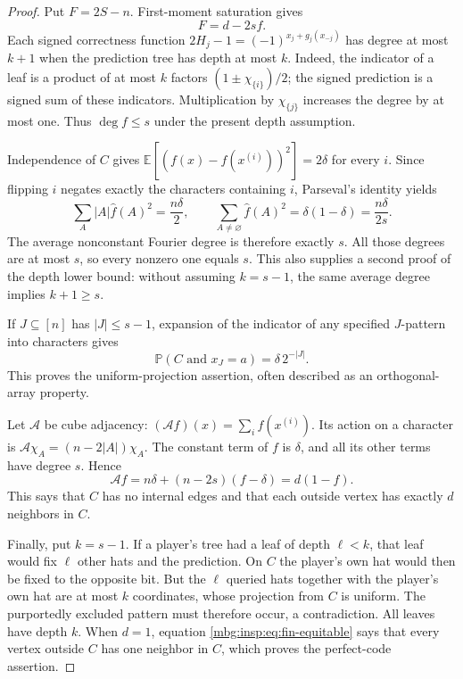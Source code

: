 \documentclass[11pt,letterpaper]{article}
\theoremstyle{definition}
\newcommand{\E}{\mathbb E}
\newcommand{\Prb}{\mathbb P}
\begin{document}
\begin{proof}
Put $F=2S-n$.  First-moment saturation gives
\begin{equation}
 F=d-2sf.
 \label{mbg:insp:eq:fin-F-f}
\end{equation}
Each signed correctness function
$2H_j-1=(-1)^{x_j+g_j(x_{-j})}$ has degree at most $k+1$ when the
prediction tree has depth at most $k$.  Indeed, the indicator of a leaf
is a product of at most $k$ factors $(1\pm\chi_{\{i\}})/2$; the signed
prediction is a signed sum of these indicators.  Multiplication by
$\chi_{\{j\}}$ increases the degree by at most one.  Thus
$\deg f\leq s$ under the present depth assumption.

Independence of $C$ gives
$\E[(f(x)-f(x^{(i)}))^2]=2\delta$ for every $i$.
Since flipping $i$ negates exactly the characters containing $i$,
Parseval's identity yields
\begin{equation}
 \sum_A |A|\widehat f(A)^2=\frac{n\delta}{2},
 \qquad
 \sum_{A\ne\varnothing}\widehat f(A)^2
 =\delta(1-\delta)=\frac{n\delta}{2s}.
 \label{mbg:insp:eq:fin-energy}
\end{equation}
The average nonconstant Fourier degree is therefore exactly $s$.
All those degrees are at most $s$, so every nonzero one equals $s$.
This also supplies a second proof of the depth lower bound: without
assuming $k=s-1$, the same average degree implies $k+1\geq s$.

If $J\subseteq[n]$ has $|J|\leq s-1$, expansion of the indicator of any
specified $J$-pattern into characters gives
\[
 \Prb(C\text{ and }x_J=a)=\delta\,2^{-|J|}.
\]
This proves the uniform-projection assertion, often described as an
orthogonal-array property.

Let $\mathcal A$ be cube adjacency:
$(\mathcal Af)(x)=\sum_i f(x^{(i)})$.
Its action on a character is
$\mathcal A\chi_A=(n-2|A|)\chi_A$.  The constant term of $f$ is $\delta$,
and all its other terms have degree $s$.  Hence
\begin{equation}
 \mathcal Af=n\delta+(n-2s)(f-\delta)
            =d(1-f).
 \label{mbg:insp:eq:fin-equitable}
\end{equation}
This says that $C$ has no internal edges and that each outside vertex
has exactly $d$ neighbors in $C$.

Finally, put $k=s-1$.  If a player's tree had a leaf of depth
$\ell<k$, that leaf would fix $\ell$ other hats and the prediction.
On $C$ the player's own hat would then be fixed to the opposite bit.
But the $\ell$ queried hats together with the player's own hat are at
most $k$ coordinates, whose projection from $C$ is uniform.  The
purportedly excluded pattern must therefore occur, a contradiction.
All leaves have depth $k$.  When $d=1$, equation
\eqref{mbg:insp:eq:fin-equitable} says that every vertex outside $C$ has one
neighbor in $C$, which proves the perfect-code assertion.
\end{proof}
\end{document}
